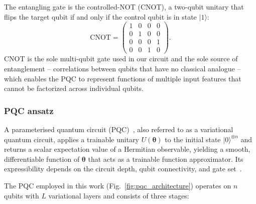 \documentclass[11pt,a4paper]{article}
\begin{document}
The entangling gate is the controlled-NOT (CNOT), a two-qubit unitary that flips the target qubit if and only if the control qubit is in state $|1\rangle$:
\begin{equation}
  \mathrm{CNOT} =
  \begin{pmatrix} 1 & 0 & 0 & 0 \\
                  0 & 1 & 0 & 0 \\
                  0 & 0 & 0 & 1 \\
                  0 & 0 & 1 & 0 \end{pmatrix}.
\end{equation}
CNOT is the sole multi-qubit gate used in our circuit and the sole source of entanglement -- correlations between qubits that have no classical analogue -- which enables the PQC to represent functions of multiple input features that cannot be factorized across individual qubits.

\subsubsection{PQC ansatz}
\label{sec:circuit_architecture}

A parameterised quantum circuit (PQC)~\citep{benedetti2019parameterized}, also referred to as a variational quantum circuit, applies a trainable unitary $U(\boldsymbol{\theta})$ to the initial state $|0\rangle^{\otimes n}$ and returns a scalar expectation value of a Hermitian observable, yielding a smooth, differentiable function of $\boldsymbol{\theta}$ that acts as a trainable function approximator. Its expressibility depends on the circuit depth, qubit connectivity, and gate set~\citep{sim2019expressibility}.

The PQC employed in this work (Fig.~\ref{fig:pqc_architecture}) operates on $n$ qubits with $L$ variational layers and consists of three stages:
\end{document}
